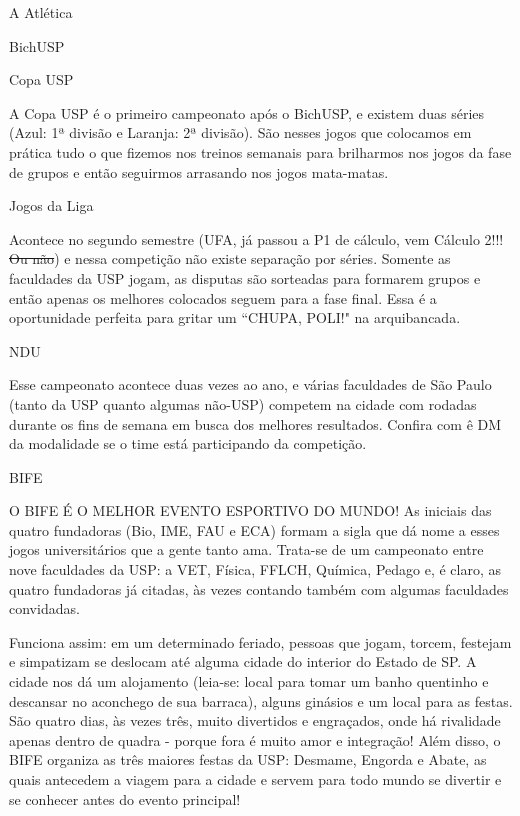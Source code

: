 \begin{secao}{A Atlética}
\begin{subsecao}{BichUSP}
\end{subsecao}
\begin{subsecao}{Copa USP}

A Copa USP é o primeiro campeonato após o BichUSP, e existem duas séries (Azul:
1ª divisão e Laranja: 2ª divisão). São nesses jogos que colocamos em prática
tudo o que fizemos nos treinos semanais para brilharmos nos jogos da fase de
grupos e então seguirmos arrasando nos jogos mata-matas.

\end{subsecao}
\begin{subsecao}{Jogos da Liga}

Acontece no segundo semestre (UFA, já passou a P1 de cálculo, vem Cálculo 2!!!
\sout{Ou não}) e nessa competição não existe separação por séries. Somente as
faculdades da USP jogam, as disputas são sorteadas para formarem grupos e
então apenas os melhores colocados seguem para a fase final. Essa é a
oportunidade perfeita para gritar um ``CHUPA, POLI!" na arquibancada.

\end{subsecao}
\begin{subsecao}{NDU}

Esse campeonato acontece duas vezes ao ano, e várias faculdades de São Paulo
(tanto da USP quanto algumas não-USP) competem na cidade com rodadas durante
os fins de semana em busca dos melhores
resultados. Confira com ê DM da modalidade se o time está participando da
competição.

\end{subsecao}
\begin{subsecao}{BIFE}

O BIFE É O MELHOR EVENTO ESPORTIVO DO MUNDO! As iniciais das quatro fundadoras
(Bio, IME, FAU e ECA) formam a sigla que dá nome a esses jogos universitários
que a gente tanto ama. Trata-se de um campeonato entre nove faculdades da USP:
a VET, Física, FFLCH, Química, Pedago e, é claro, as quatro fundadoras já 
citadas, às vezes contando também com algumas faculdades convidadas.

Funciona assim: em um determinado feriado, pessoas que jogam, torcem, festejam e
simpatizam se deslocam até alguma cidade do interior do Estado de SP. A cidade nos
dá um alojamento (leia-se: local para tomar um banho quentinho e descansar no
aconchego de sua barraca), alguns ginásios e um local para as festas. São
quatro dias, às vezes três, muito divertidos e engraçados, onde há rivalidade 
apenas dentro de quadra - porque fora é muito amor e integração! Além disso,
o BIFE organiza as três maiores festas da USP: Desmame, Engorda e Abate, as
quais antecedem a viagem para a cidade e servem para todo mundo se divertir e
se conhecer antes do evento principal!


\end{subsecao}
\end{secao}
